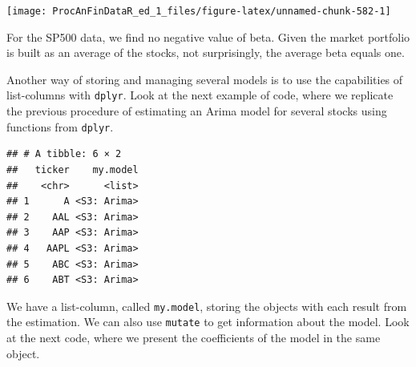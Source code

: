 \documentclass[11pt,]{book}
\newenvironment{Shaded}{\begin{snugshade}}{\end{snugshade}}
\newcommand{\KeywordTok}[1]{\textcolor[rgb]{0.27,0.27,0.27}{\textbf{#1}}}
\newcommand{\DataTypeTok}[1]{\textcolor[rgb]{0.27,0.27,0.27}{#1}}
\newcommand{\DecValTok}[1]{\textcolor[rgb]{0.06,0.06,0.06}{#1}}
\newcommand{\StringTok}[1]{\textcolor[rgb]{0.5,0.5,0.5}{#1}}
\newcommand{\OperatorTok}[1]{\textcolor[rgb]{0.81,0.36,0.00}{\textbf{#1}}}
\newcommand{\NormalTok}[1]{#1}
\begin{document}
\begin{center}\texttt{[image: ProcAnFinDataR\_ed\_1\_files/figure-latex/unnamed-chunk-582-1]} \end{center}

For the SP500 data, we find no negative value of beta. Given the market
portfolio is built as an average of the stocks, not surprisingly, the
average beta equals one.

Another way of storing and managing several models is to use the
capabilities of list-columns with \texttt{dplyr}. Look at the next
example of code, where we replicate the previous procedure of estimating
an Arima model for several stocks using functions from \texttt{dplyr}.

\begin{Shaded}
\end{Shaded}

\begin{verbatim}
## # A tibble: 6 × 2
##   ticker    my.model
##    <chr>      <list>
## 1      A <S3: Arima>
## 2    AAL <S3: Arima>
## 3    AAP <S3: Arima>
## 4   AAPL <S3: Arima>
## 5    ABC <S3: Arima>
## 6    ABT <S3: Arima>
\end{verbatim}

We have a list-column, called \texttt{my.model}, storing the objects
with each result from the estimation. We can also use \texttt{mutate} to
get information about the model. Look at the next code, where we present
the coefficients of the model in the same object.
\end{document}
